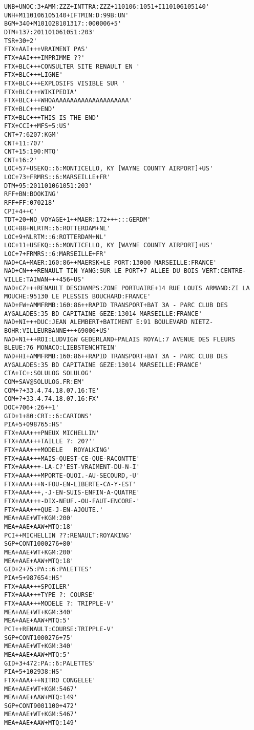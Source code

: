 \label{ex_bl}
\begin{lstlisting}
UNB+UNOC:3+AMM:ZZZ+INTTRA:ZZZ+110106:1051+I110106105140'
UNH+M110106105140+IFTMIN:D:99B:UN'
BGM+340+M101028101317::000006+5'
DTM+137:201101061051:203'
TSR+30+2'
FTX+AAI+++VRAIMENT PAS'
FTX+AAI+++IMPRIMME ??'
FTX+BLC+++CONSULTER SITE RENAULT EN '
FTX+BLC+++LIGNE'
FTX+BLC+++EXPLOSIFS VISIBLE SUR '
FTX+BLC+++WIKIPEDIA'
FTX+BLC+++WHOAAAAAAAAAAAAAAAAAAAAA'
FTX+BLC+++END'
FTX+BLC+++THIS IS THE END'
FTX+CCI++MFS+5:US'
CNT+7:6207:KGM'
CNT+11:707'
CNT+15:190:MTQ'
CNT+16:2'
LOC+57+USEKQ::6:MONTICELLO, KY [WAYNE COUNTY AIRPORT]+US'
LOC+73+FRMRS::6:MARSEILLE+FR'
DTM+95:201101061051:203'
RFF+BN:BOOKING'
RFF+FF:070218'
CPI+4++C'
TDT+20+NO_VOYAGE+1++MAER:172+++:::GERDM'
LOC+88+NLRTM::6:ROTTERDAM+NL'
LOC+9+NLRTM::6:ROTTERDAM+NL'
LOC+11+USEKQ::6:MONTICELLO, KY [WAYNE COUNTY AIRPORT]+US'
LOC+7+FRMRS::6:MARSEILLE+FR'
NAD+CA+MAER:160:86++MAERSK+LE PORT:13000 MARSEILLE:FRANCE'
NAD+CN+++RENAULT TIN YANG:SUR LE PORT+7 ALLEE DU BOIS VERT:CENTRE-VILLE:TAIWAN+++456+US'
NAD+CZ+++RENAULT DESCHAMPS:ZONE PORTUAIRE+14 RUE LOUIS ARMAND:ZI LA MOUCHE:95130 LE PLESSIS BOUCHARD:FRANCE'
NAD+FW+AMMFRMB:160:86++RAPID TRANSPORT+BAT 3A - PARC CLUB DES AYGALADES:35 BD CAPITAINE GEZE:13014 MARSEILLE:FRANCE'
NAD+NI+++DUC:JEAN ALEMBERT+BATIMENT E:91 BOULEVARD NIETZ-BOHR:VILLEURBANNE+++69006+US'
NAD+N1+++ROI:LUDVIGW GEDERLAND+PALAIS ROYAL:7 AVENUE DES FLEURS BLEUE:76 MONACO:LIEBSTENCHTEIN'
NAD+HI+AMMFRMB:160:86++RAPID TRANSPORT+BAT 3A - PARC CLUB DES AYGALADES:35 BD CAPITAINE GEZE:13014 MARSEILLE:FRANCE'
CTA+IC+:SOLULOG SOLULOG'
COM+SAV@SOLULOG.FR:EM'
COM+?+33.4.74.18.07.16:TE'
COM+?+33.4.74.18.07.16:FX'
DOC+706+:26++1'
GID+1+80:CRT::6:CARTONS'
PIA+5+098765:HS'
FTX+AAA+++PNEUX MICHELLIN'
FTX+AAA+++TAILLE ?: 20?''
FTX+AAA+++MODELE   ROYALKING'
FTX+AAA+++MAIS-QUEST-CE-QUE-RACONTTE'
FTX+AAA+++-LA-C?'EST-VRAIMENT-DU-N-I'
FTX+AAA+++MPORTE-QUOI.-AU-SECOURD,-U'
FTX+AAA+++N-FOU-EN-LIBERTE-CA-Y-EST'
FTX+AAA+++,-J-EN-SUIS-ENFIN-A-QUATRE'
FTX+AAA+++-DIX-NEUF.-OU-FAUT-ENCORE-'
FTX+AAA+++QUE-J-EN-AJOUTE.'
MEA+AAE+WT+KGM:200'
MEA+AAE+AAW+MTQ:18'
PCI++MICHELLIN ??:RENAULT:ROYAKING'
SGP+CONT1000276+80'
MEA+AAE+WT+KGM:200'
MEA+AAE+AAW+MTQ:18'
GID+2+75:PA::6:PALETTES'
PIA+5+987654:HS'
FTX+AAA+++SPOILER'
FTX+AAA+++TYPE ?: COURSE'
FTX+AAA+++MODELE ?: TRIPPLE-V'
MEA+AAE+WT+KGM:340'
MEA+AAE+AAW+MTQ:5'
PCI++RENAULT:COURSE:TRIPPLE-V'
SGP+CONT1000276+75'
MEA+AAE+WT+KGM:340'
MEA+AAE+AAW+MTQ:5'
GID+3+472:PA::6:PALETTES'
PIA+5+102938:HS'
FTX+AAA+++NITRO CONGELEE'
MEA+AAE+WT+KGM:5467'
MEA+AAE+AAW+MTQ:149'
SGP+CONT9001100+472'
MEA+AAE+WT+KGM:5467'
MEA+AAE+AAW+MTQ:149'

\end{lstlisting}
